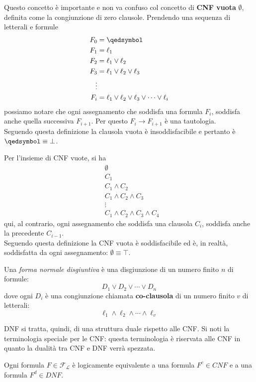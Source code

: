 Questo concetto è importante e non va confuso col concetto 
di \textbf{CNF vuota} $\emptyset$, definita come la congiunzione di zero clausole. 
Prendendo una sequenza di letterali e formule
\begin{align*}
F_0 & = \qedsymbol \\
F_1 & = \ell_1 \\
F_2 & = \ell_1 \lor \ell_2 \\
F_3 & = \ell_1 \lor \ell_2 \lor \ell_3 \\
\vdots \\
F_i & = \ell_1 \lor \ell_2 \lor \ell_3 \lor \cdots \lor \ell_i
\end{align*}
possiamo notare che ogni assegnamento che soddisfa una formula $F_i$, soddisfa anche quella successiva $F_{i+1}$. Per questo $F_i \rightarrow F_{i+1}$ è una tautologia. \\
Seguendo questa definizione la clausola vuota è insoddisfacibile e pertanto è $\qedsymbol \equiv \bot$.

Per l'insieme di CNF vuote, si ha 
\begin{align*}
& \emptyset \\
& C_1 \\
& C_1 \land C_2 \\
& C_1 \land C_2 \land C_3\\
& \vdots \\
& C_1 \land C_2 \land C_3 \land C_4
\end{align*}
qui, al contrario, ogni assegnamento che soddisfa una clausola $C_i$, soddisfa anche la precedente $C_{i-1}$. \\
Seguendo questa definizione la CNF vuota è soddisfacibile ed è, in realtà, soddisfatta da ogni assegnamento: $\emptyset \equiv \top$. 

\begin{defi}
Una \textit{forma normale disgiuntiva} è una disgiunzione di un numero finito $n$ di formule:
$$
D_1 \lor D_2 \lor \cdots \lor D_n
$$
dove ogni $D_i$ è una congiunzione chiamata \textbf{co-clausola} di un numero finito $v$ di letterali:
$$
\ell_1 \land \ell_2 \land \cdots \land \ell_v
$$
\end{defi}

DNF si tratta, quindi, di una struttura duale rispetto alle CNF.
Si noti la terminologia speciale per le CNF: questa terminologia è riservata alle CNF in quanto la dualità tra CNF e DNF verrà spezzata. 

\begin{lem}
Ogni formula $F \in \mathscr{F_L}$ è logicamente equivalente a una formula $F^c \in CNF$ 
e a una formula $F^d \in DNF$.
\end{lem}

